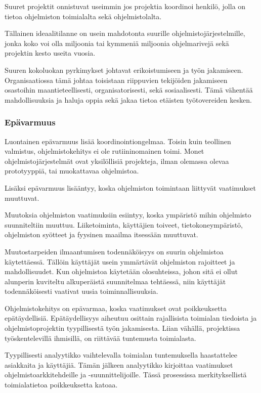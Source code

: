 \documentclass[finnish]{tktltiki2}
\theoremstyle{definition}
\theoremstyle{remark}
\begin{document}
Suuret projektit onnistuvat useimmin jos projektia koordinoi henkilö, jolla on tietoa ohjelmiston toimialalta sekä ohjelmistolalta.\cite{KES95}

Tällainen ideaalitilanne on usein mahdotonta suurille ohjelmistojärjestelmille, jonka koko voi olla miljoonia tai kymmeniä miljoonia ohjelmarivejä sekä projektin kesto useita vuosia.\cite{KES95}

Suuren kokoluokan pyrkimykset johtavat erikoistumiseen ja työn jakamiseen. Organisaatiossa tämä johtaa toisistaan riippuvien tekijöiden jakamiseen osastoihin maantieteellisesti, organisatorisesti, sekä sosiaalisesti. Tämä vähentää mahdollisuuksia ja haluja oppia sekä jakaa tietoa etäisten työtovereiden kesken.\cite{KES95}

\subsubsection{Epävarmuus}
Luontainen epävarmuus lisää koordinointiongelmaa. Toisin kuin teollinen valmistus, ohjelmistokehitys ei ole rutiininomainen toimi. Monet ohjelmistojärjestelmät ovat yksilöllisiä projekteja, ilman olemassa olevaa prototyyppiä, tai muokattavaa ohjelmistoa.\cite{KES95}


Lisäksi epävarmuus lisääntyy, koska ohjelmiston toimintaan liittyvät vaatimukset muuttuvat. 

Muutoksia ohjelmiston vaatimuksiin esiintyy, koska ympäristö mihin ohjelmisto suunniteltiin muuttuu. Liiketoiminta, käyttäjien toiveet, tietokoneympäristö, ohjelmiston syötteet ja fyysinen maailma itsessään muuttuvat. 

Muutostarpeiden ilmaantumisen todennäköisyys on suurin ohjelmistoa käytettäessä. Tällöin käyttäjät usein ymmärtävät ohjelmiston rajoitteet ja mahdollisuudet. Kun ohjelmistoa käytetään olosuhteissa, johon sitä ei ollut alunperin kuviteltu alkuperäistä suunnitelmaa tehtäessä, niin käyttäjät todennäköisesti vaativat uusia toiminnallisuuksia. \cite{KES95}

Ohjelmistokehitys on epävarmaa, koska vaatimukset ovat poikkeuksetta epätäydellisiä. Epätäydellisyys aiheutuu osittain rajallisista toimialan tiedoista ja ohjelmistoprojektin tyypillisestä työn jakamisesta. Liian vähällä, projektissa työskentelevillä ihmisillä, on riittävää tuntemusta toimialasta. \cite{KES95}

Tyypillisesti analyytikko vaihtelevalla toimialan tuntemuksella haastattelee asiakkaita ja käyttäjiä. Tämän jälkeen analyytikko kirjoittaa vaatimukset ohjelmistoarkkitehdeille ja -suunnittelijoille. Tässä prosessissa merkityksellistä toimialatietoa poikkeuksetta katoaa.\cite{KES95}
\end{document}
